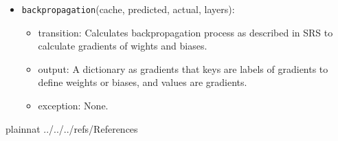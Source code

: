 \documentclass[12pt, titlepage]{article}
\def\code#1{\texttt{#1}}
\begin{document}
\begin{itemize}
  \item \code{backpropagation}(cache, predicted, actual, layers):
  \begin{itemize}
    \item transition: Calculates backpropagation process as described in SRS \cite{SRS} 
    to calculate gradients of wights and biases. 
    \item output: A dictionary as gradients that keys are labels of gradients to define weights or biases, 
    and values are gradients.
    \item exception: None.
  \end{itemize}

\end{itemize}

\newpage

 {plainnat}
 {../../../refs/References}

\newpage





\end{document}
